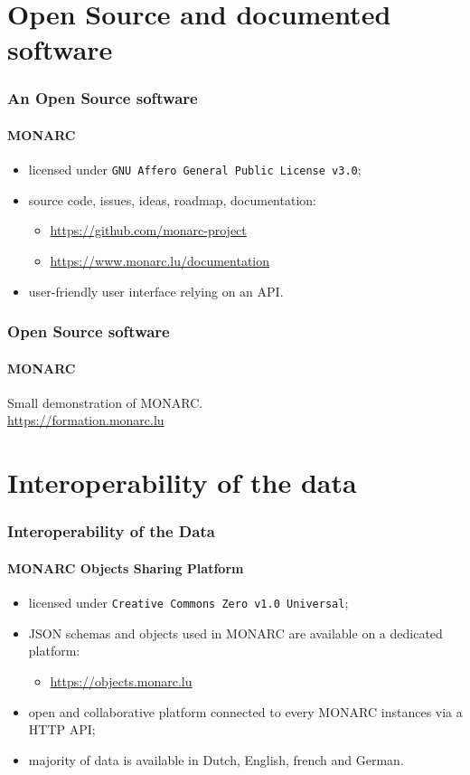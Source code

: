 \documentclass[]{beamer}
\begin{document}
\section{Open Source and documented software}
\begin{frame}
  \frametitle{An Open Source software}
  \framesubtitle{MONARC}
  \begin{center}
    \begin{itemize}
      \item licensed under \texttt{GNU Affero General Public License v3.0};
      \item source code, issues, ideas, roadmap, documentation:
        \begin{itemize}
            \item \url{https://github.com/monarc-project}
            \item \url{https://www.monarc.lu/documentation}
        \end{itemize}
      \item user-friendly user interface relying on an API.
    \end{itemize}
  \end{center}
\end{frame}

\begin{frame}
  \frametitle{Open Source software}
  \framesubtitle{MONARC}
  Small demonstration of MONARC.\\
  \url{https://formation.monarc.lu}
\end{frame}


\section{Interoperability of the data}
\begin{frame}
  \frametitle{Interoperability of the Data}
  \framesubtitle{MONARC Objects Sharing Platform}
  \begin{center}
    \begin{itemize}
      \item licensed under \texttt{Creative Commons Zero v1.0 Universal};
      \item JSON schemas and objects used in MONARC are available on a dedicated platform:\\
        \begin{itemize}
            \item \url{https://objects.monarc.lu}
        \end{itemize}
      \item open and collaborative platform connected to every MONARC instances via a HTTP API;
      \item majority of data is available in Dutch, English, french and German.
    \end{itemize}
  \end{center}
\end{frame}
\end{document}
